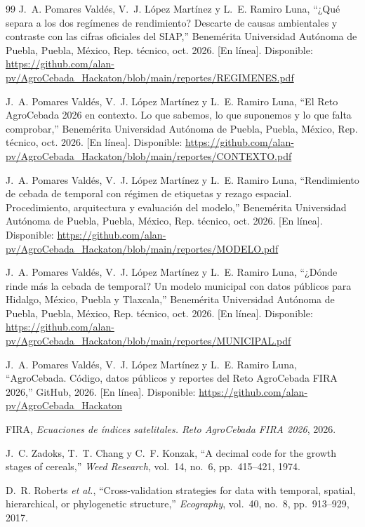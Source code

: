 \begin{thebibliography}{99}
J.~A. Pomares Valdés, V.~J. López Martínez y L.~E. Ramiro Luna, ``¿Qué separa a los dos regímenes de rendimiento?
Descarte de causas ambientales y contraste con las cifras oficiales del SIAP,'' Benemérita Universidad Autónoma de
Puebla, Puebla, México, Rep. técnico, oct. 2026. [En línea]. Disponible:
\url{https://github.com/alan-pv/AgroCebada_Hackaton/blob/main/reportes/REGIMENES.pdf}

J.~A. Pomares Valdés, V.~J. López Martínez y L.~E. Ramiro Luna, ``El Reto AgroCebada 2026 en contexto. Lo que sabemos,
lo que suponemos y lo que falta comprobar,'' Benemérita Universidad Autónoma de Puebla, Puebla, México, Rep. técnico,
oct. 2026. [En línea]. Disponible: \url{https://github.com/alan-pv/AgroCebada_Hackaton/blob/main/reportes/CONTEXTO.pdf}

J.~A. Pomares Valdés, V.~J. López Martínez y L.~E. Ramiro Luna, ``Rendimiento de cebada de temporal con régimen de
etiquetas y rezago espacial. Procedimiento, arquitectura y evaluación del modelo,'' Benemérita Universidad Autónoma de
Puebla, Puebla, México, Rep. técnico, oct. 2026. [En línea]. Disponible:
\url{https://github.com/alan-pv/AgroCebada_Hackaton/blob/main/reportes/MODELO.pdf}

J.~A. Pomares Valdés, V.~J. López Martínez y L.~E. Ramiro Luna, ``¿Dónde rinde más la cebada de temporal? Un modelo
municipal con datos públicos para Hidalgo, México, Puebla y Tlaxcala,'' Benemérita Universidad Autónoma de Puebla,
Puebla, México, Rep. técnico, oct. 2026. [En línea]. Disponible:
\url{https://github.com/alan-pv/AgroCebada_Hackaton/blob/main/reportes/MUNICIPAL.pdf}

J.~A. Pomares Valdés, V.~J. López Martínez y L.~E. Ramiro Luna, ``AgroCebada. Código, datos públicos y reportes del Reto AgroCebada FIRA 2026,'' GitHub, 2026.
[En línea]. Disponible: \url{https://github.com/alan-pv/AgroCebada_Hackaton}


FIRA, \emph{Ecuaciones de índices satelitales. Reto AgroCebada FIRA 2026}, 2026.

J.~C. Zadoks, T.~T. Chang y C.~F. Konzak, ``A decimal code for the growth stages of cereals,'' \emph{Weed Research}, vol.~14, no.~6, pp.~415--421, 1974.

D.~R. Roberts \emph{et al.}, ``Cross-validation strategies for data with temporal, spatial, hierarchical, or
phylogenetic structure,'' \emph{Ecography}, vol.~40, no.~8, pp.~913--929, 2017.


\end{thebibliography}
